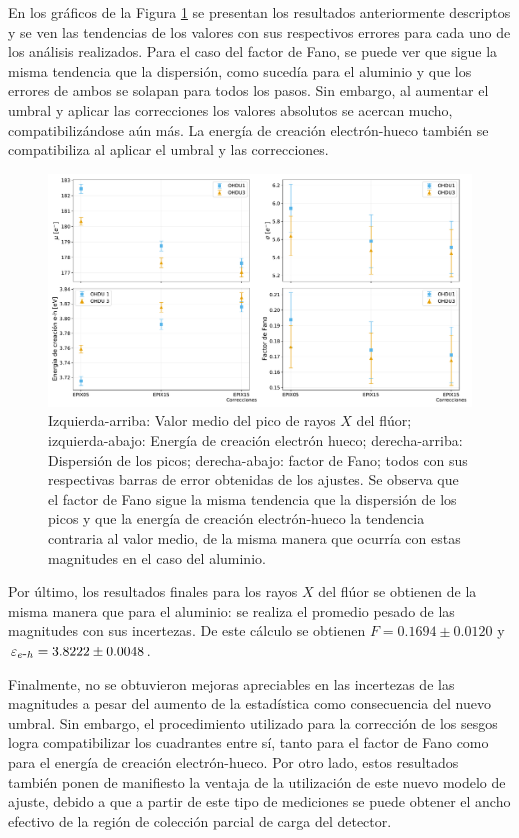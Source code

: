 En los gráficos de la Figura \ref{fig:F_mu_sigma_fano_eh} se presentan los resultados anteriormente descriptos y se ven las tendencias de los valores con sus respectivos errores para cada uno de los análisis realizados. Para el caso del factor de Fano, se puede ver que sigue la misma tendencia que la dispersión, como sucedía para el aluminio y que los errores de ambos se solapan para todos los pasos. Sin embargo, al aumentar el umbral y aplicar las correcciones los valores absolutos se acercan mucho, compatibilizándose aún más. La energía de creación electrón-hueco también se compatibiliza al aplicar el umbral y las correcciones.
\begin{figure}[h]
    \centering
        \includegraphics[scale=0.45]{Figs/F_mu_sigma_fano_Eeh.pdf}
    \caption{Izquierda-arriba: Valor medio del pico de rayos $X$ del flúor; izquierda-abajo: Energía de creación electrón hueco; derecha-arriba: Dispersión de los picos; derecha-abajo: factor de Fano; todos con sus respectivas barras de error obtenidas de los ajustes. Se observa que el factor de Fano sigue la misma tendencia que la dispersión de los picos y que la energía de creación electrón-hueco la tendencia contraria al valor medio, de la misma manera que ocurría con estas magnitudes en el caso del aluminio.}
    \label{fig:F_mu_sigma_fano_eh}
\end{figure}

Por último, los resultados finales para los rayos $X$ del flúor se obtienen de la misma manera que para el aluminio:  se realiza el promedio pesado de las magnitudes con sus incertezas. De este cálculo se obtienen $F = 0.1694 \pm 0.0120 $ y $\varepsilon_{e\mbox{-}h} = 3.8222 \pm 0.0048$.

Finalmente, no se obtuvieron mejoras apreciables en las incertezas de las magnitudes a pesar del aumento de la estadística como consecuencia del nuevo umbral. Sin embargo, el procedimiento utilizado para la corrección de los sesgos logra compatibilizar los cuadrantes entre sí, tanto para el factor de Fano como para el energía de creación electrón-hueco. Por otro lado, estos resultados también ponen de manifiesto la ventaja de la utilización de este nuevo modelo de ajuste, debido a que a partir de este tipo de mediciones se puede obtener el ancho efectivo de la región de colección parcial de carga del detector.

